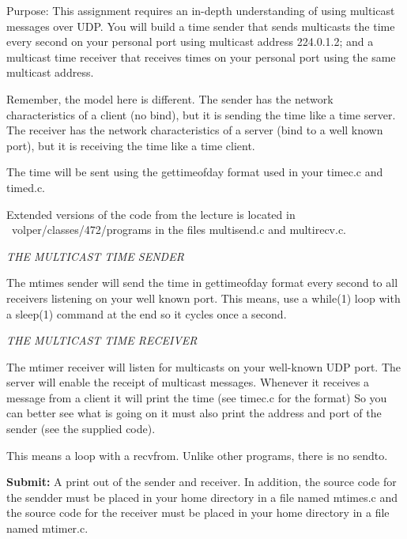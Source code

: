 

\parindent 0pt

Purpose: This assignment requires an in-depth understanding of
using multicast messages over UDP.
You will build a time sender that sends multicasts the time
every  second
on your personal port using multicast address {\ltt{}224.0.1.2};
and a multicast time receiver
that receives times on your personal port using the same multicast
address.

Remember, the model here is different. 
The sender has the network
characteristics of a client (no bind), but it is sending
the time like a time server.
The receiver has the network characteristics of a server (bind
to a well known port), but it is receiving the time like
a time client.

The time will be sent using the {\ltt{}gettimeofday} format
used in your {\ltt{}timec.c} and {\ltt{}timed.c}.

Extended versions of the code from the lecture is located
in {\ltt{}~volper/classes/472/programs} in the files
{\ltt{}multisend.c} and {\ltt{}multirecv.c}.

{\it THE MULTICAST TIME SENDER}

The {\ltt{}mtimes} sender will send the time in {\ltt{}gettimeofday} format
every second to all receivers listening on your well known port. 
This means, use a {\ltt{}while(1)} loop with a {\ltt{}sleep(1)}
command at the end so it cycles once a second.

{\it THE MULTICAST TIME RECEIVER}

The {\ltt{}mtimer} receiver will listen for multicasts
on your well-known UDP port.
The server will enable the receipt of multicast messages.
Whenever it receives a message from a client it will
print the time (see {\ltt{}timec.c} for the format)
So you can better see what is going on
it must also print the address and port of the sender
(see the supplied code).

This means a loop with a {\ltt{}recvfrom}.
Unlike other programs, there is no {\ltt{}sendto}.

{\bf Submit:}
A print out of the sender and receiver.
In addition,
the source code for the sendder must be placed in your home directory
in a file named {\ltt{}mtimes.c} and
the source code for the receiver must be placed in your home directory
in a file named {\ltt{}mtimer.c}.

